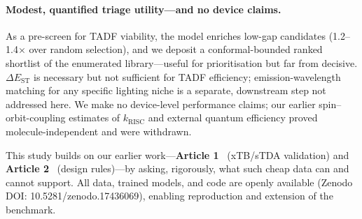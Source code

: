 \paragraph{Modest, quantified triage utility---and no device claims.}
As a pre-screen for TADF viability, the model enriches low-gap candidates
(\numrange{1.2}{1.4}$\times$ over random selection), and we deposit a conformal-bounded
ranked shortlist of the enumerated library---useful for prioritisation but far from
decisive. $\Delta E_\text{ST}$ is necessary but not sufficient for TADF efficiency;
emission-wavelength matching for any specific lighting niche is a separate, downstream
step not addressed here. We make no device-level performance claims; our earlier
spin--orbit-coupling estimates of $k_\text{RISC}$ and external quantum
efficiency proved molecule-independent and were withdrawn.

This study builds on our earlier work---\textbf{Article 1}~\cite{Tchapet2024_xTB}
(xTB/sTDA validation) and \textbf{Article 2}~\cite{Tchapet2024_DataDriven} (design
rules)---by asking, rigorously, what such cheap data can and cannot support.
All data, trained models, and code are openly available (Zenodo DOI:
10.5281/zenodo.17436069), enabling reproduction and extension of the benchmark.
